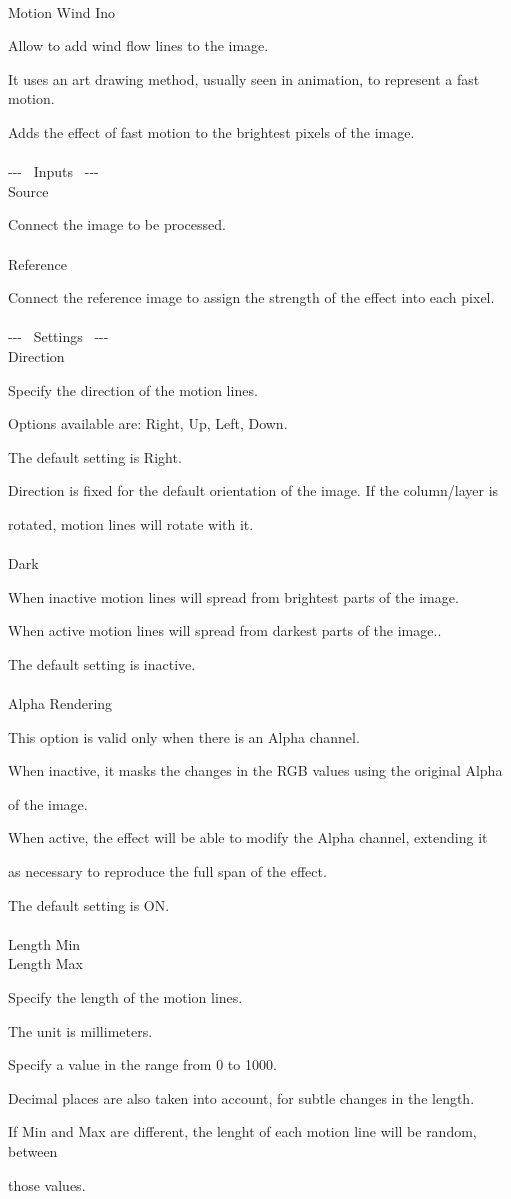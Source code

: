 \documentclass[a4paper,12pt]{article}
\begin{document}
\thispagestyle{empty}

\Large
\noindent \\
Motion Wind Ino\medskip
\par
\normalsize
Allow to add wind flow lines to the image.
\par
It uses an art drawing method, usually seen in animation, to represent a fast motion.\par
Adds the effect of fast motion to the brightest pixels of the image.\\
\\
-{-}- \ Inputs \ -{-}-\\
Source\par
Connect the image to be processed.\\
\\
Reference\par
Connect the reference image to assign the strength of the effect into each pixel.\\
\\
-{-}- \ Settings \ -{-}-\\
Direction\par
Specify the direction of the motion lines.\par
Options available are: Right, Up, Left, Down.\par
The default setting is Right.\par
Direction is fixed for the default orientation of the image. If the column/layer is\par 
rotated, motion lines will rotate with it.\\
\\
Dark\par
When inactive motion lines will spread from brightest parts of the image.\par
When active motion lines will spread from darkest parts of the image..\par
The default setting is inactive.\\
\\
Alpha Rendering\par
This option is valid only when there is an Alpha channel.\par
When inactive, it masks the changes in the RGB values using the original Alpha\par 
of the image.\par
When active, the effect will be able to modify the Alpha channel, extending it\par 
as necessary to reproduce the full span of the effect.\par
The default setting is ON.\\
\\
Length Min\\
Length Max\par
Specify the length of the motion lines.\par
The unit is millimeters.\par
Specify a value in the range from 0 to 1000.\par
Decimal places are also taken into account, for subtle changes in the length.\par
If Min and Max are different, the lenght of each motion line will be random, between\par 
those values.
\end{document}
